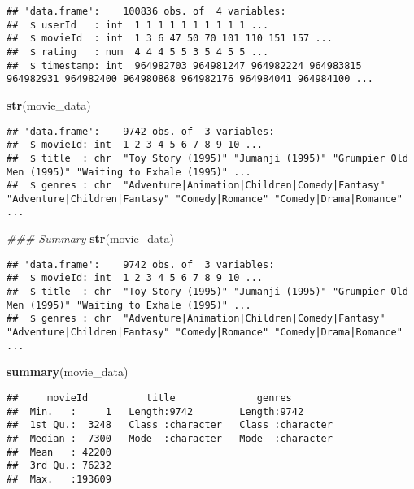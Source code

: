 \documentclass[]{article}
\newenvironment{Shaded}{\begin{snugshade}}{\end{snugshade}}
\newcommand{\CommentTok}[1]{\textcolor[rgb]{0.56,0.35,0.01}{\textit{#1}}}
\newcommand{\KeywordTok}[1]{\textcolor[rgb]{0.13,0.29,0.53}{\textbf{#1}}}
\newcommand{\NormalTok}[1]{#1}
\begin{document}
\begin{verbatim}
## 'data.frame':    100836 obs. of  4 variables:
##  $ userId   : int  1 1 1 1 1 1 1 1 1 1 ...
##  $ movieId  : int  1 3 6 47 50 70 101 110 151 157 ...
##  $ rating   : num  4 4 4 5 5 3 5 4 5 5 ...
##  $ timestamp: int  964982703 964981247 964982224 964983815 964982931 964982400 964980868 964982176 964984041 964984100 ...
\end{verbatim}

\begin{Shaded}
\begin{Highlighting}[]
\KeywordTok{str}\NormalTok{(movie_data)}
\end{Highlighting}
\end{Shaded}

\begin{verbatim}
## 'data.frame':    9742 obs. of  3 variables:
##  $ movieId: int  1 2 3 4 5 6 7 8 9 10 ...
##  $ title  : chr  "Toy Story (1995)" "Jumanji (1995)" "Grumpier Old Men (1995)" "Waiting to Exhale (1995)" ...
##  $ genres : chr  "Adventure|Animation|Children|Comedy|Fantasy" "Adventure|Children|Fantasy" "Comedy|Romance" "Comedy|Drama|Romance" ...
\end{verbatim}

\begin{Shaded}
\begin{Highlighting}[]
\CommentTok{### Summary}
\KeywordTok{str}\NormalTok{(movie_data)}
\end{Highlighting}
\end{Shaded}

\begin{verbatim}
## 'data.frame':    9742 obs. of  3 variables:
##  $ movieId: int  1 2 3 4 5 6 7 8 9 10 ...
##  $ title  : chr  "Toy Story (1995)" "Jumanji (1995)" "Grumpier Old Men (1995)" "Waiting to Exhale (1995)" ...
##  $ genres : chr  "Adventure|Animation|Children|Comedy|Fantasy" "Adventure|Children|Fantasy" "Comedy|Romance" "Comedy|Drama|Romance" ...
\end{verbatim}

\begin{Shaded}
\begin{Highlighting}[]
\KeywordTok{summary}\NormalTok{(movie_data)}
\end{Highlighting}
\end{Shaded}

\begin{verbatim}
##     movieId          title              genres         
##  Min.   :     1   Length:9742        Length:9742       
##  1st Qu.:  3248   Class :character   Class :character  
##  Median :  7300   Mode  :character   Mode  :character  
##  Mean   : 42200                                        
##  3rd Qu.: 76232                                        
##  Max.   :193609
\end{verbatim}
\end{document}
